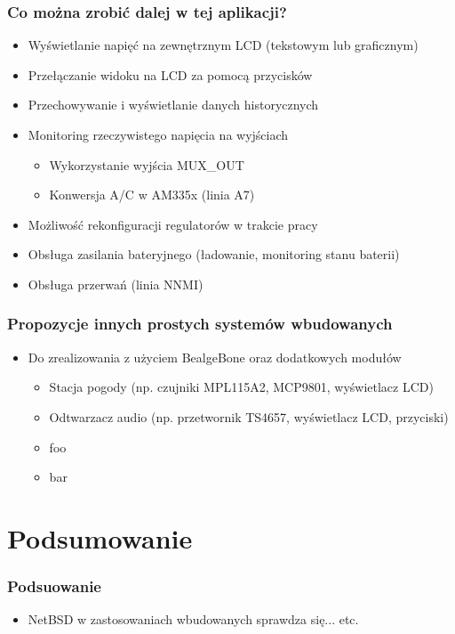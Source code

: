 \documentclass[dvipsnames,table]{beamer}
\begin{document}
\begin{frame}
\frametitle{Co można zrobić dalej w tej aplikacji?}
\begin{itemize}
	\item Wyświetlanie napięć na zewnętrznym LCD (tekstowym lub graficznym)
	\item Przełączanie widoku na LCD za pomocą przycisków
	\item Przechowywanie i wyświetlanie danych historycznych
	\item Monitoring rzeczywistego napięcia na wyjściach
	\begin{itemize}
		\item Wykorzystanie wyjścia MUX\_OUT
		\item Konwersja A/C w AM335x (linia A7)
	\end{itemize}
	\item Możliwość rekonfiguracji regulatorów w trakcie pracy
	\item Obsługa zasilania bateryjnego (ładowanie, monitoring stanu baterii)
	\item Obsługa przerwań (linia NNMI)
\end{itemize}
\end{frame}

\begin{frame}
\frametitle{Propozycje innych prostych systemów wbudowanych}
\begin{itemize}
	\item Do zrealizowania z użyciem BealgeBone oraz dodatkowych modułów
	\begin{itemize}
		\item Stacja pogody (np. czujniki MPL115A2, MCP9801, wyświetlacz LCD)
		\item Odtwarzacz audio (np. przetwornik TS4657, wyświetlacz LCD, przyciski)
		\item foo
		\item bar
	\end{itemize}
\end{itemize}
\end{frame}


\section{Podsumowanie}

\begin{frame}
\frametitle{Podsuowanie}
\begin{itemize}
	\item NetBSD w zastosowaniach wbudowanych sprawdza się... etc.
\end{itemize}
\end{frame}
\end{document}
